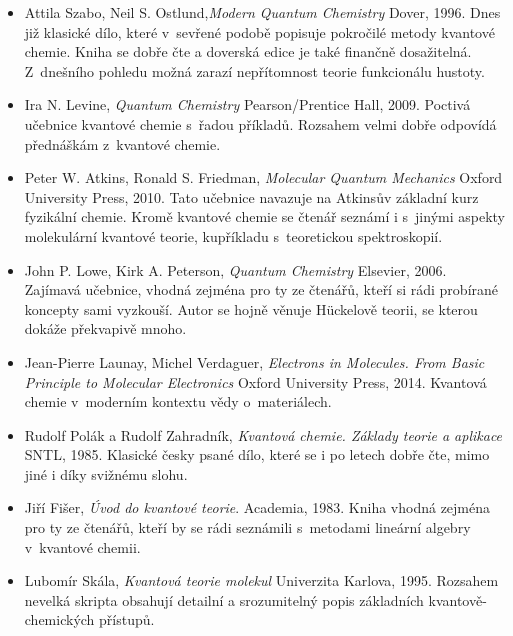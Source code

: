 \begin{itemize}

\item Attila Szabo, Neil S. Ostlund,\textit{Modern Quantum Chemistry} Dover, 1996. Dnes již klasické dílo, které v~sevřené podobě popisuje pokročilé metody kvantové chemie. Kniha se dobře čte a doverská edice je také finančně dosažitelná. Z~dnešního pohledu možná zarazí nepřítomnost teorie funkcionálu hustoty. 
\item Ira N. Levine, \textit{Quantum Chemistry} Pearson/Prentice Hall, 2009. Poctivá učebnice kvantové chemie s~řadou příkladů. Rozsahem velmi dobře odpovídá přednáškám z~kvantové chemie. 
\item Peter W. Atkins, Ronald S. Friedman, \textit{Molecular Quantum Mechanics} Oxford University Press, 2010. Tato učebnice navazuje na Atkinsův základní kurz fyzikální chemie. Kromě kvantové chemie se čtenář seznámí i s~jinými aspekty molekulární kvantové teorie, kupříkladu s~teoretickou spektroskopií.  
\item John P. Lowe, Kirk A. Peterson, \textit{Quantum Chemistry} Elsevier, 2006. Zajímavá učebnice, vhodná zejména pro ty ze čtenářů, kteří si rádi probírané koncepty sami vyzkouší. Autor se hojně věnuje H\"uckelově teorii, se kterou dokáže překvapivě mnoho.
\item Jean-Pierre Launay, Michel Verdaguer, \textit{Electrons in Molecules. From Basic Principle to Molecular Electronics} Oxford University Press, 2014. Kvantová chemie v~moderním kontextu vědy o~materiálech. 
\item Rudolf Polák a Rudolf Zahradník, \textit{Kvantová chemie. Základy teorie a aplikace} SNTL, 1985. Klasické česky psané dílo, které se i po letech dobře čte, mimo jiné i díky svižnému slohu.
\item Jiří Fišer, \textit{Úvod do kvantové teorie}. Academia, 1983. Kniha vhodná zejména pro ty ze čtenářů, kteří by se rádi seznámili s~metodami lineární algebry v~kvantové chemii.
\item Lubomír Skála, \textit{Kvantová teorie molekul} Univerzita Karlova, 1995. Rozsahem nevelká skripta obsahují detailní a srozumitelný popis základních kvantově-chemických přístupů.

\end{itemize}
